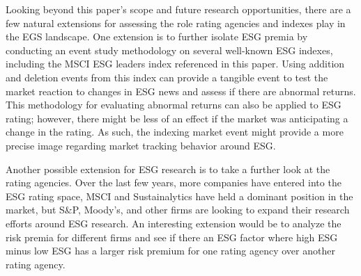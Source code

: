 Looking beyond this paper's scope and future research opportunities, there are a few natural extensions for assessing the role rating agencies and indexes play in the EGS landscape. One extension is to further isolate ESG premia by conducting an event study methodology on several well-known ESG indexes, including the MSCI ESG leaders index referenced in this paper. Using addition and deletion events from this index can provide a tangible event to test the market reaction to changes in ESG news and assess if there are abnormal returns. This methodology for evaluating abnormal returns can also be applied to ESG rating; however, there might be less of an effect if the market was anticipating a change in the rating. As such, the indexing market event might provide a more precise image regarding market tracking behavior around ESG.

Another possible extension for ESG research is to take a further look at the rating agencies. Over the last few years, more companies have entered into the ESG rating space, MSCI and Sustainalytics have held a dominant position in the market, but S\&P, Moody's, and other firms are looking to expand their research efforts around ESG research. An interesting extension would be to analyze the risk premia for different firms and see if there an ESG factor where high ESG minus low ESG has a larger risk premium for one rating agency over another rating agency.
